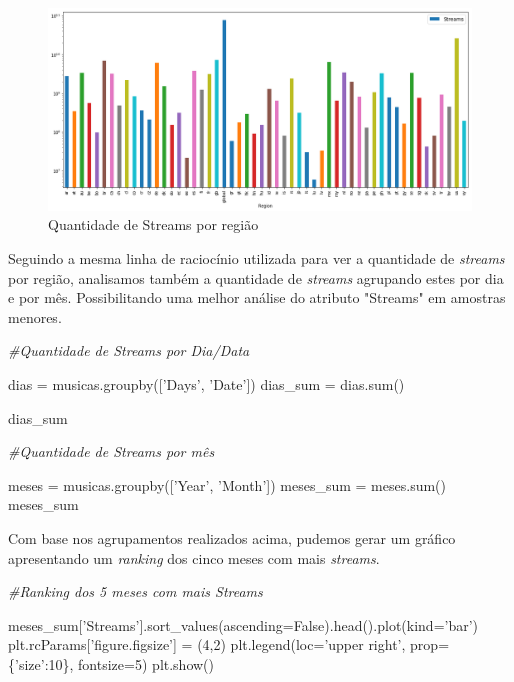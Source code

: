 \documentclass[11pt]{article}
\makeatletter
\def\maxwidth{\ifdim\Gin@nat@width>\linewidth\linewidth
    \else\Gin@nat@width\fi}
\let\Oldincludegraphics\includegraphics
\renewcommand{\includegraphics}[1]{\Oldincludegraphics[width=.8\maxwidth]{#1}}
\newenvironment{Shaded}{}{}
\newcommand{\DecValTok}[1]{\textcolor[rgb]{0.25,0.63,0.44}{{#1}}}
\newcommand{\StringTok}[1]{\textcolor[rgb]{0.25,0.44,0.63}{{#1}}}
\newcommand{\CommentTok}[1]{\textcolor[rgb]{0.38,0.63,0.69}{\textit{{#1}}}}
\newcommand{\NormalTok}[1]{{#1}}
\newcommand{\VariableTok}[1]{\textcolor[rgb]{0.10,0.09,0.49}{{#1}}}
\newcommand{\OperatorTok}[1]{\textcolor[rgb]{0.40,0.40,0.40}{{#1}}}
\newcommand{\BuiltInTok}[1]{{#1}}
\makeatother
\begin{document}
\begin{figure}
\centering
\includegraphics{output_8_0.png}
\caption{Quantidade de Streams por região}
\end{figure}

    Seguindo a mesma linha de raciocínio utilizada para ver a quantidade de
\emph{streams} por região, analisamos também a quantidade de
\emph{streams} agrupando estes por dia e por mês. Possibilitando uma
melhor análise do atributo "Streams" em amostras menores.

    \begin{Shaded}
\begin{Highlighting}[]
    \CommentTok{#Quantidade de Streams por Dia/Data}

\NormalTok{dias }\OperatorTok{=}\NormalTok{ musicas.groupby([}\StringTok{'Days'}\NormalTok{, }\StringTok{'Date'}\NormalTok{])}
\NormalTok{dias_sum }\OperatorTok{=}\NormalTok{ dias.}\BuiltInTok{sum}\NormalTok{()}

\NormalTok{dias_sum}

    \CommentTok{#Quantidade de Streams por mês}

\NormalTok{meses }\OperatorTok{=}\NormalTok{ musicas.groupby([}\StringTok{'Year'}\NormalTok{, }\StringTok{'Month'}\NormalTok{])}
\NormalTok{meses_sum }\OperatorTok{=}\NormalTok{ meses.}\BuiltInTok{sum}\NormalTok{()}
\NormalTok{meses_sum}
\end{Highlighting}
\end{Shaded}

    Com base nos agrupamentos realizados acima, pudemos gerar um gráfico
apresentando um \emph{ranking} dos cinco meses com mais \emph{streams}.

    \begin{Shaded}
\begin{Highlighting}[]
    \CommentTok{#Ranking dos 5 meses com mais Streams}

\NormalTok{meses_sum[}\StringTok{'Streams'}\NormalTok{].sort_values(ascending}\OperatorTok{=}\VariableTok{False}\NormalTok{).head().plot(kind}\OperatorTok{=}\StringTok{'bar'}\NormalTok{)}
\NormalTok{plt.rcParams[}\StringTok{'figure.figsize'}\NormalTok{] }\OperatorTok{=}\NormalTok{ (}\DecValTok{4}\NormalTok{,}\DecValTok{2}\NormalTok{)}
\NormalTok{plt.legend(loc}\OperatorTok{=}\StringTok{'upper right'}\NormalTok{, prop}\OperatorTok{=}\NormalTok{\{}\StringTok{'size'}\NormalTok{:}\DecValTok{10}\NormalTok{\}, fontsize}\OperatorTok{=}\DecValTok{5}\NormalTok{)}
\NormalTok{plt.show()}
\end{Highlighting}
\end{Shaded}
\end{document}

